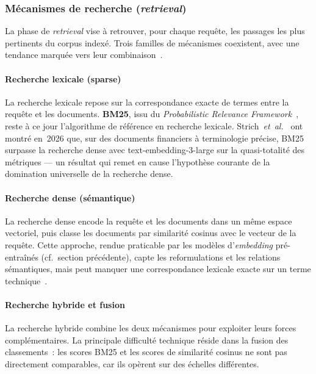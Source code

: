 \documentclass[11pt,a4paper]{article}
\begin{document}
\subsubsection{Mécanismes de recherche (\textit{retrieval})}

La phase de \textit{retrieval} vise à retrouver, pour chaque requête, les passages les plus pertinents du corpus indexé. Trois familles de mécanismes coexistent, avec une tendance marquée vers leur combinaison~\cite{gao2024ragsurvey,wang2024bestpractices}.

\paragraph{Recherche lexicale (sparse)}

La recherche lexicale repose sur la correspondance exacte de termes entre la requête et les documents. \textbf{BM25}, issu du \textit{Probabilistic Relevance Framework}~\cite{robertson2009bm25}, reste à ce jour l'algorithme de référence en recherche lexicale. Strich~\textit{et~al.}~\cite{strich2026bm25} ont montré en~2026 que, sur des documents financiers à terminologie précise, BM25 surpasse la recherche dense avec text-embedding-3-large sur la quasi-totalité des métriques --- un résultat qui remet en cause l'hypothèse courante de la domination universelle de la recherche dense.

\paragraph{Recherche dense (sémantique)}

La recherche dense encode la requête et les documents dans un même espace vectoriel, puis classe les documents par similarité cosinus avec le vecteur de la requête. Cette approche, rendue praticable par les modèles d'\textit{embedding} pré-entraînés (cf.~section précédente), capte les reformulations et les relations sémantiques, mais peut manquer une correspondance lexicale exacte sur un terme technique~\cite{chen2024bgem3}.

\paragraph{Recherche hybride et fusion}

La recherche hybride combine les deux mécanismes pour exploiter leurs forces complémentaires. La principale difficulté technique réside dans la fusion des classements~: les scores BM25 et les scores de similarité cosinus ne sont pas directement comparables, car ils opèrent sur des échelles différentes.
\end{document}
